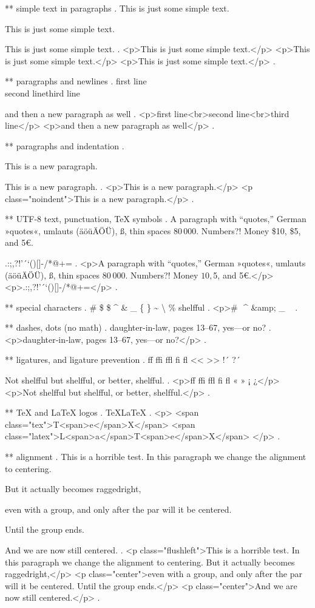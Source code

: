 ** simple text in paragraphs
.
This is just some simple text.

This is just some simple text.

This is just some simple text.
.
<p>This is just some simple text.</p>
<p>This is just some simple text.</p>
<p>This is just some simple text.</p>
.


** paragraphs and newlines
.
first line\\second line\newline third line\par and then a new paragraph as well
.
<p>ﬁrst line<br>second line<br>third line</p>
<p>and then a new paragraph as well</p>
.


** paragraphs and indentation
.
\noindent

\noindent

This is a new paragraph.

\noindent
This is a new paragraph.
.
<p>This is a new paragraph.</p>
<p class="noindent">This is a new paragraph.</p>
.


** UTF-8 text, punctuation, TeX symbols
.
A para\-graph with “quotes,” German »quotes«, umlauts (äöüÄÖÜ), ß, thin spaces 80\,000. Numbers?! Money \$10, \$5, and 5€.

.:;,?!'´`()[]-/*@+=
.
<p>A para­graph with “quotes,” German »quotes«, umlauts (äöüÄÖÜ), ß, thin spaces 80 000. Numbers?! Money $10, $5, and 5€.</p>
<p>.:;,?!'´`()[]‐/*@+=</p>
.


** special characters
.
\# \$ \$ \^{} \& \_ \{ \} \~{} \textbackslash{} \% shelf\-ful
.
<p># $ $ ^​ &amp; _ { } ~​ \​ %
.


** dashes, dots (no math)
.
daughter-in-law, pages 13--67, yes---or no?
.
<p>daughter‐in‐law, pages 13–67, yes—or no?</p>
.


** ligatures, and ligature prevention
.
ff ffi ffl fi fl << >> !´ ?´

Not shelfful but shelf\mbox{}ful, or better, shelf\/ful.
.
<p>ﬀ ﬃ ﬄ ﬁ ﬂ « » ¡ ¿</p>
<p>Not shelﬀul but shelfful, or better, shelf‌ful.</p>
.


** TeX and LaTeX logos
.
\TeX \LaTeX
.
<p>
<span class="tex">T<span>e</span>X</span>
<span class="latex">L<span>a</span>T<span>e</span>X</span>
</p>
.


** alignment
.
This is a horrible test.
\centering
In this paragraph we change the alignment to centering.
{\raggedright But it actually becomes raggedright,

even with a group, and only after the par will it be centered.}
Until the group ends.

And we are now still centered.
.
<p class="flushleft">This is a horrible test. In this paragraph we change the alignment to centering. But it actually becomes raggedright,</p>
<p class="center">even with a group, and only after the par will it be centered.​ Until the group ends.</p>
<p class="center">And we are now still centered.</p>
.
